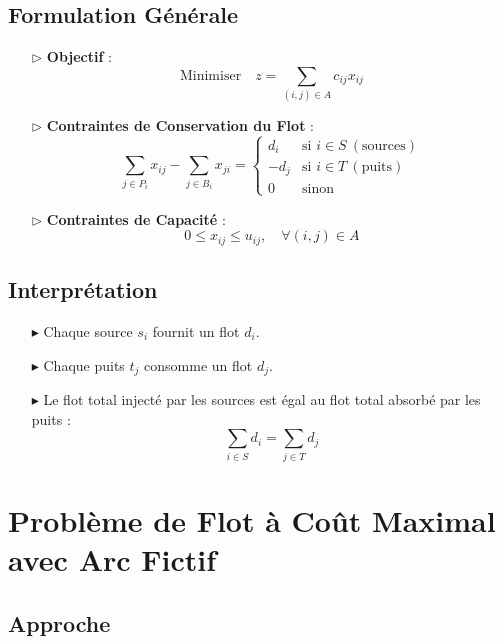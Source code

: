 \documentclass{report}
\begin{document}
\begin{multicols*}{2}
    \subsection{Formulation Générale}
        \begin{itemize}
            \item[$\rhd$] \textbf{Objectif} :
            \[%
            \text{Minimiser} \quad z = \sum_{(i,j) \in A} c_{ij} x_{ij}
            \]%
            \item[$\rhd$] \textbf{Contraintes de Conservation du Flot} :
            \[%
            \sum_{j \in P_i} x_{ij} - \sum_{j \in B_i} x_{ji} =
                \begin{cases}
                     d_i & \text{si } i \in S \ (\text{sources}) \\
                    -d_j & \text{si } i \in T \ (\text{puits}) \\
                      0 & \text{sinon}
                \end{cases}
            \]%
            \item[$\rhd$] \textbf{Contraintes de Capacité} :
            \[%
            0 \leq x_{ij} \leq u_{ij}, \quad \forall (i,j) \in A
            \]%
        \end{itemize}

        \subsection{Interprétation}

        \begin{itemize}
            \item[$\blacktriangleright$] Chaque source \( s_i \) fournit un flot \( d_i \).
            \item[$\blacktriangleright$] Chaque puits \( t_j \) consomme un flot \( d_j \).
            \item[$\blacktriangleright$] Le flot total injecté par les sources est 
                                    égal au flot total absorbé par les puits :
            \[%
            \sum_{i \in S} d_i = \sum_{j \in T} d_j
            \]%
        \end{itemize}

\section{Problème de Flot à Coût Maximal avec Arc Fictif}
    \subsection{Approche}


\end{multicols*}
\end{document}
